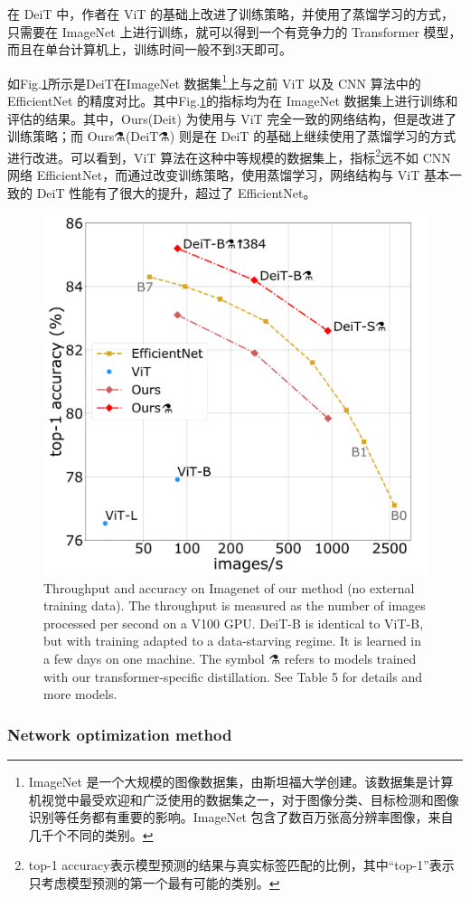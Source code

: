\documentclass[letterpaper,10pt]{article}
\begin{document}
	在 DeiT 中，作者在 ViT 的基础上改进了训练策略，并使用了蒸馏学习的方式，只需要在 ImageNet 上进行训练，就可以得到一个有竞争力的 Transformer 模型，而且在单台计算机上，训练时间一般不到3天即可。
	
	如Fig.\ref{fig: DeiT accuracy}所示是DeiT在ImageNet 数据集\footnote{ImageNet 是一个大规模的图像数据集，由斯坦福大学创建。该数据集是计算机视觉中最受欢迎和广泛使用的数据集之一，对于图像分类、目标检测和图像识别等任务都有重要的影响。ImageNet 包含了数百万张高分辨率图像，来自几千个不同的类别。}上与之前 ViT 以及 CNN 算法中的 EfficientNet 的精度对比。其中Fig.\ref{fig: DeiT accuracy}的指标均为在 ImageNet 数据集上进行训练和评估的结果。其中，Ours(Deit) 为使用与 ViT 完全一致的网络结构，但是改进了训练策略；而 Ours⚗(DeiT⚗) 则是在 DeiT 的基础上继续使用了蒸馏学习的方式进行改进。可以看到，ViT 算法在这种中等规模的数据集上，指标\footnote{top-1 accuracy表示模型预测的结果与真实标签匹配的比例，其中“top-1”表示只考虑模型预测的第一个最有可能的类别。}远不如 CNN 网络 EfficientNet，而通过改变训练策略，使用蒸馏学习，网络结构与 ViT 基本一致的 DeiT 性能有了很大的提升，超过了 EfficientNet。
	
	\begin{figure}[htbp]
		\centering 
		\includegraphics[width=0.5
		\columnwidth]{picture/Accuracy}
		\caption{
			\label{fig: DeiT accuracy} Throughput and accuracy on Imagenet of our method (no external training data). The throughput is measured as the number of images processed per second on a V100 GPU. DeiT-B is identical to ViT-B, but with training adapted to a data-starving regime. It is learned in a few days on one machine. The symbol ⚗ refers to models trained with our transformer-specific distillation. See Table 5 for details and more models.
		}
	\end{figure}
	
	\subsubsection{Network optimization method}
	
\end{document}
